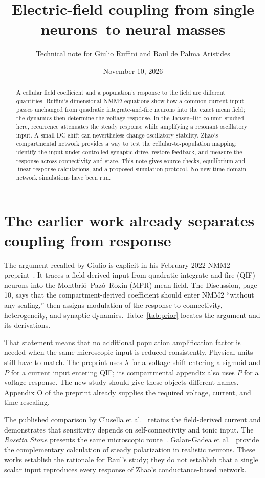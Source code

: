 \documentclass[11pt,a4paper]{article}
\title{Electric-field coupling from single neurons\ to neural masses}
\author{Technical note for Giulio Ruffini and Raul de Palma Aristides}
\date{November 10, 2026}
\begin{document}
\maketitle
\begin{abstract}
A cellular field coefficient and a population's response to the field are different quantities. Ruffini's dimensional NMM2 equations show how a common current input passes unchanged from quadratic integrate-and-fire neurons into the exact mean field; the dynamics then determine the voltage response. In the Jansen--Rit column studied here, recurrence attenuates the steady response while amplifying a resonant oscillatory input. A small DC shift can nevertheless change oscillatory stability. Zhao's compartmental network provides a way to test the cellular-to-population mapping: identify the input under controlled synaptic drive, restore feedback, and measure the response across connectivity and state. This note gives source checks, equilibrium and linear-response calculations, and a proposed simulation protocol. No new time-domain network simulations have been run.
\end{abstract}

\section{The earlier work already separates coupling from response}

The argument recalled by Giulio is explicit in his February 2022 NMM2 preprint~\cite{ruffini}. It traces a field-derived input from quadratic integrate-and-fire (QIF) neurons into the Montbri\'o--Paz\'o--Roxin (MPR) mean field. The Discussion, page 10, says that the compartment-derived coefficient should enter NMM2 ``without any scaling,'' then assigns modulation of the response to connectivity, heterogeneity, and synaptic dynamics. Table~\ref{tab:prior} locates the argument and its derivations.

That statement means that no additional population amplification factor is needed when the same microscopic input is reduced consistently. Physical units still have to match. The preprint uses $\lambda$ for a voltage shift entering a sigmoid and $P$ for a current input entering QIF; its compartmental appendix also uses $P$ for a voltage response. The new study should give these objects different names. Appendix O of the preprint already supplies the required voltage, current, and time rescaling.

The published comparison by Clusella et al.~\cite{clusella} retains the field-derived current and demonstrates that sensitivity depends on self-connectivity and tonic input. The \emph{Rosetta Stone} presents the same microscopic route~\cite{rosetta}. Galan-Gadea et al.~\cite{galan} provide the complementary calculation of steady polarization in realistic neurons. These works establish the rationale for Raul's study; they do not establish that a single scalar input reproduces every response of Zhao's conductance-based network.
\end{document}
